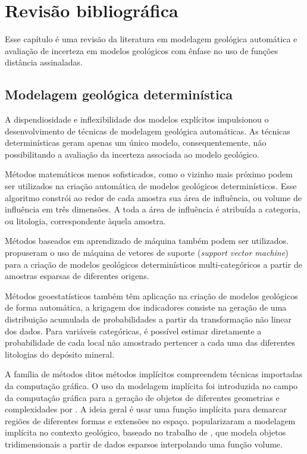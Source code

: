 \chapter{Revisão bibliográfica}

Esse capítulo é uma revisão da literatura em modelagem geológica automática e avaliação de incerteza em modelos geológicos com ênfase no uso de funções distância assinaladas.

\section{Modelagem geológica determinística}

A dispendiosidade e inflexibilidade dos modelos explícitos impulsionou o desenvolvimento de técnicas de modelagem geológica automáticas. As técnicas determinísticas geram apenas um único modelo, consequentemente, não possibilitando a avaliação da incerteza associada ao modelo geológico. 

Métodos matemáticos menos sofisticados, como o vizinho mais próximo podem ser utilizados na criação automática de modelos geológicos determinísticos. Esse algoritmo constrói ao redor de cada amostra sua área de influência, ou volume de influência em três dimensões. A toda a área de influência é atribuída a categoria, ou litologia, correspondente àquela amostra. 

Métodos baseados em aprendizado de máquina também podem ser utilizados.  propuseram o uso de máquina de vetores de suporte (\textit{support vector machine}) para a criação de modelos geológicos determinísticos multi-categóricos a partir de amostras esparsas de diferentes origens.

Métodos geoestatísticos também têm aplicação na criação de modelos geológicos de forma automática, a krigagem dos indicadores \cite{alabert1987stochastic} consiste na geração de uma distribuição acumulada de probabilidades a partir da transformação não linear dos dados. Para variáveis categóricas, é possível estimar diretamente a probabilidade de cada local não amostrado pertencer a cada uma das diferentes litologias do depósito mineral.
 
A família de métodos ditos métodos implícitos compreendem técnicas importadas da computação gráfica. O uso da modelagem implícita foi introduzida no campo da computação gráfica para a geração de objetos de diferentes geometrias e complexidades por  . A ideia geral é usar uma função implícita para demarcar regiões de diferentes formas e extensões no espaço.  popularizaram a modelagem implícita no contexto geológico, baseado no trabalho de , que modela objetos tridimensionais a partir de dados esparsos interpolando uma função volume.

